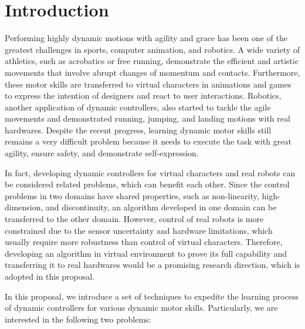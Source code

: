 \chapter{Introduction}


Performing highly dynamic motions with agility and grace has been
one of the greatest challenges in sports, computer animation, and robotics.
A wide variety of athletics, such as acrobatics or free running, demonstrate the
efficient and artistic movements that involve abrupt changes of momentum
and contacts.
Furthermore, these motor skills are transferred to virtual characters 
in animations and games to express the intention of designers
and react to user interactions.
Robotics, another application of dynamic controllers, also started 
to tackle the agile movements and demonstrated
running, jumping, and landing motions with real hardwares.
Despite the recent progress, 
learning dynamic motor skills still remains a very difficult
problem because it needs to execute the task with great agility, 
ensure safety, and demonstrate self-expression.

In fact, developing dynamic controllers for virtual characters and
real robots can be considered related problems,
which can benefit each other.
Since the control problems in two domains have shared properties,
such as non-linearity, high-dimension, and discontinuity,
an algorithm developed in one domain can be transferred 
to the other domain.
However, control of real robots is more constrained
due to the sensor uncertainty and hardware limitations, which 
usually require more robustness than control of virtual characters.
Therefore, developing an algorithm in virtual environment to prove its
full capability and transferring it to real hardwares would be
a promising research direction, which is adopted in this proposal.

In this proposal, we introduce a set of techniques to expedite
the learning process of dynamic controllers for various dynamic motor 
skills. 
Particularly, we are interested in the following two problems:

